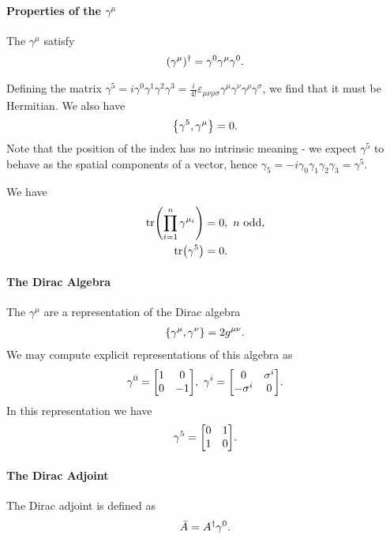 \paragraph{Properties of the $\gamma^{\mu}$}
The $\gamma^{\mu}$ satisfy
\begin{align*}
	(\gamma^{\mu})^{\dagger} = \gamma^{0}\gamma^{\mu}\gamma^{0}.
\end{align*}

Defining the matrix $\gamma^{5} = i\gamma^{0}\gamma^{1}\gamma^{2}\gamma^{3} = \frac{i}{4!}\varepsilon_{\mu\nu\rho\sigma}\gamma^{\mu}\gamma^{\nu}\gamma^{\rho}\gamma^{\sigma}$, we find that it must be Hermitian. We also have
\begin{align*}
	\acomm{\gamma^{5}}{\gamma^{\mu}} = 0.
\end{align*}
Note that the position of the index has no intrinsic meaning - we expect $\gamma^{5}$ to behave as the spatial components of a vector, hence $\gamma_{5} = -i\gamma_{0}\gamma_{1}\gamma_{2}\gamma_{3} = \gamma^{5}$.

We have
\begin{align*}
	\tr(\prod\limits_{i = 1}^{n}\gamma^{\mu_{i}}) &= 0,\ n\text{ odd}, \\
	\tr(\gamma^{5})                               &= 0.
\end{align*}

\paragraph{The Dirac Algebra}
The $\gamma^{\mu}$ are a representation of the Dirac algebra
\begin{align*}
	\acomm{\gamma^{\mu}}{\gamma^{\nu}} = 2g^{\mu\nu}.
\end{align*}
We may compute explicit representations of this algebra as
\begin{align*}
	\gamma^{0} = 
	\mqty[
		1 & 0 \\
		0 & -1
	],\ 
	\gamma^{i} = 
	\mqty[
		0           & \sigma^{i} \\
		-\sigma^{i} & 0
	].
\end{align*}
In this representation we have
\begin{align*}
	\gamma^{5} =
	\mqty[
		0 & 1 \\
		1 & 0
	].
\end{align*}

\paragraph{The Dirac Adjoint}
The Dirac adjoint is defined as
\begin{align*}
	\bar{A} = A^{\dagger}\gamma^{0}.
\end{align*}

